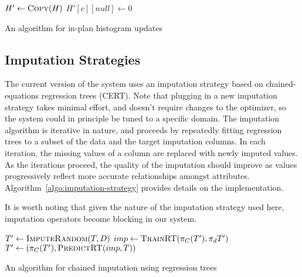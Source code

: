 \begin{algorithm}
  \begin{algorithmic}
    
	\EndIf
	\State $H' \gets \Call{Copy}{H}$
			\State $H'[c][null] \gets 0$
		\EndFor
			\State {}
		\EndFor
		\State {}
		\State {}
	\EndIf
    \EndFunction
  \end{algorithmic}
  \caption{An algorithm for in-plan histogram updates}
  \label{algo:histogram-transformation}
\end{algorithm}

\subsection{Imputation Strategies}
The current version of the system uses an imputation strategy based on chained-equations regression trees (CERT)\cite{burgette2010multiple}. Note that plugging in a new
imputation strategy takes minimal effort, and doesn't require changes to the optimizer, so the system could in principle be tuned to a specific domain.
The imputation algorithm is iterative in nature, and proceeds by repeatedly fitting regression trees to a subset of the data and the target imputation columns.
In each iteration, the missing values of a column are replaced with newly imputed values. As the iterations proceed, the quality of the imputation
should improve as values progressively reflect more accurate relationships amongst attributes. Algorithm~\ref{algo:imputation-strategy}
provides details on the implementation.

It is worth noting that given the nature of the imputation strategy used here, imputation operators become blocking in our system.

\begin{algorithm}
  \begin{algorithmic}
    
    	\State $T' \gets \Call{ImputeRandom}{T, D}$
			\State $imp \gets \Call{TrainRT}{\pi_C(T'), \pi_d{T'}}$
			\State $T' \gets (\pi_C(T'), \Call{PredictRT}{imp, T})$
		\EndFor
	\EndFor
	\EndFunction
  \end{algorithmic}
  \caption{An algorithm for chained imputation using regression trees}
  \label{algo:imputation-strategy}
\end{algorithm}





